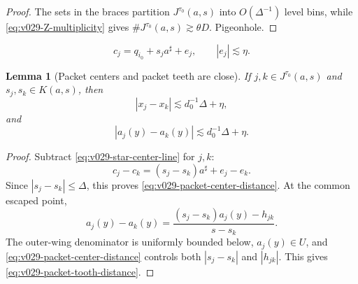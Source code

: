 \documentclass[10pt]{article}
\newtheorem{lemma}[theorem]{Lemma}
\begin{document}
\begin{proof}
The sets in the braces partition \(J^{\tau_0}(a,s)\) into
\(O(\Delta^{-1})\) level bins, while
\eqref{eq:v029-Z-multiplicity} gives
\(\#J^{\tau_0}(a,s)\gtrsim\theta D\).  Pigeonhole.
\end{proof}

\begin{equation}
\label{eq:v029-star-center-line}
\boxed{
c_j
=
q_{i_0}+s_ja^\sharp+e_j,
\qquad
|e_j|
\lesssim
\eta.
}
\end{equation}

\begin{lemma}[Packet centers and packet teeth are close]
\label{lem:v029-packet-cap}
If \(j,k\in J^{\tau_0}(a,s)\) and
\(s_j,s_k\in K(a,s)\), then
\begin{equation}
\label{eq:v029-packet-center-distance}
\boxed{
|x_j-x_k|
\lesssim
d_0^{-1}\Delta+\eta,
}
\end{equation}
and
\begin{equation}
\label{eq:v029-packet-tooth-distance}
\boxed{
|a_j(y)-a_k(y)|
\lesssim
d_0^{-1}\Delta+\eta.
}
\end{equation}
\end{lemma}

\begin{proof}
Subtract
\eqref{eq:v029-star-center-line} for \(j,k\):
\[
c_j-c_k
=
(s_j-s_k)a^\sharp+e_j-e_k.
\]
Since \(|s_j-s_k|\le\Delta\), this proves
\eqref{eq:v029-packet-center-distance}.  At the common escaped point,
\begin{equation}
\label{eq:v029-tooth-difference-identity}
\boxed{
a_j(y)-a_k(y)
=
\frac{
(s_j-s_k)a_j(y)-h_{jk}
}{
s-s_k
}.
}
\end{equation}
The outer-wing denominator is uniformly bounded below, \(a_j(y)\in U\), and
\eqref{eq:v029-packet-center-distance} controls both \(|s_j-s_k|\) and \(|h_{jk}|\).  This gives
\eqref{eq:v029-packet-tooth-distance}.
\end{proof}
\end{document}
